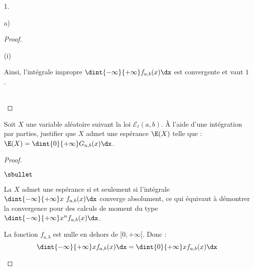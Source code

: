 \documentclass[11pt]{article}%
\begin{document}
\begin{noliste}{1.}
\begin{noliste}{a)}
\begin{proof}
\begin{nonoliste}{(i)}


        \noindent
        Ainsi, l'intégrale impropre $\dint{-\infty}{+\infty} f_{a,
          b}(x) \dx$ est convergente et vaut $1$.
      \end{nonoliste}
      ~\\[-1cm] 
    \end{proof}

  \item Soit $X$ une variable aléatoire suivant la loi
    $\mathcal{E}_\ell(a,b)$. À l'aide d'une intégration par parties,
    justifier que $X$ admet une espérance $\E(X)$ telle que : $\E(X) =
    \dint{0}{+\infty} G_{a,b}(x)\dx$.

    \begin{proof}~
      \begin{noliste}{$\sbullet$}
      \item La \var $X$ admet une espérance si et seulement si
        l'intégrale $\dint{-\infty}{+\infty} x \ f_{a, b}(x) \dx$
        converge absolument, ce qui équivaut à démontrer la
        convergence pour des calculs de moment du type $\dint{-\infty}
        {+\infty} x^n f_{a,b}(x) \dx$.

      \item La fonction $f_{a, b}$ est nulle en dehors de $[0,
        +\infty[$. Donc :
        \[
        \dint{-\infty}{+\infty} x f_{a, b}(x) \dx = \dint{0}{+\infty}
        x f_{a, b}(x) \dx
        \]


\end{noliste}
\end{proof}
\end{noliste}
\end{noliste}
\end{document}
